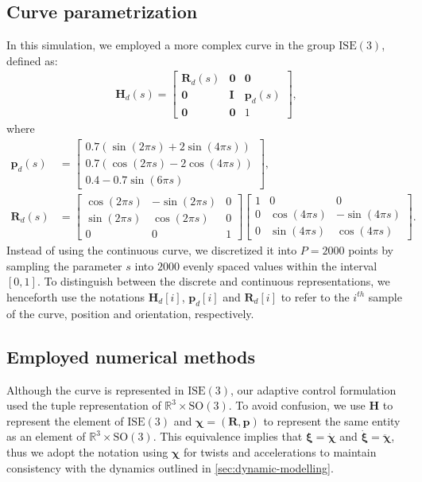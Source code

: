 \subsection{Curve parametrization}
In this simulation, we employed a more complex curve in the group $\text{ISE}(3)$, defined as:
\begin{align}
    \mathbf{H}_d(s) = \begin{bmatrix}
        \mathbf{R}_d(s) & \mathbf{0} & \mathbf{0}\\
        \mathbf{0} & \mathbf{I} & \mathbf{p}_d(s)\\
        \mathbf{0} & \mathbf{0} & 1
    \end{bmatrix},\label{eq:parametriceq-simulation}
\end{align}
where
\begin{align}
    \mathbf{p}_d(s) &= \begin{bmatrix}
        0.7(\sin(2\pi s) + 2\sin(4\pi s))\\
        0.7(\cos(2\pi s) - 2\cos(4\pi s))\\
        0.4 - 0.7\sin(6\pi s)
    \end{bmatrix},\\
    \mathbf{R}_d(s) &= \begin{bmatrix}
        \cos(2\pi s) & -\sin(2\pi s) & 0\\
        \sin(2\pi s) & \cos(2\pi s) & 0\\
        0 & 0 & 1
    \end{bmatrix}\begin{bmatrix}
        1 & 0 & 0\\
        0 & \cos(4\pi s) & -\sin(4\pi s)\\
        0 & \sin(4\pi s) & \cos(4\pi s)
    \end{bmatrix}.
\end{align}
Instead of using the continuous curve, we discretized it into $P=\num{2000}$ points by sampling the parameter $s$ into $\num{2000}$ evenly spaced values within the interval $[0, 1]$. To distinguish between the discrete and continuous representations, we henceforth use the notations $\mathbf{H}_d[i]$, $\mathbf{p}_d[i]$ and $\mathbf{R}_d[i]$ to refer to the $i^{th}$ sample of the curve, position and orientation, respectively.
\subsection{Employed numerical methods}\label{sec:results-adaptive-nummerical-methods}
Although the curve is represented in $\text{ISE}(3)$, our adaptive control formulation used the tuple representation of $\mathbb{R}^3\times \text{SO}(3)$. To avoid confusion, we use $\mathbf{H}$ to represent the element of $\text{ISE}(3)$ and $\boldsymbol{\chi}=(\mathbf{R}, \mathbf{p})$ to represent the same entity as an element of $\mathbb{R}^3\times \text{SO}(3)$. This equivalence implies that $\boldsymbol{\xi}=\dot{\boldsymbol{\chi}}$ and $\dot{\boldsymbol{\xi}} = \ddot{\boldsymbol{\chi}}$, thus we adopt the notation using $\boldsymbol{\chi}$ for twists and accelerations to maintain consistency with the dynamics outlined in \cref{sec:dynamic-modelling}.


